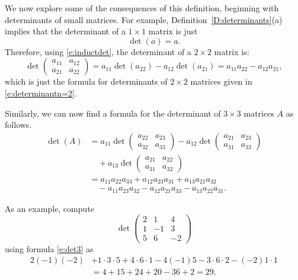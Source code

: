 \documentclass{ximera}
\begin{document}
We now explore some of the consequences of this definition, beginning 
with determinants of small matrices.  For example, 
Definition~\ref{D:determinants}(a) implies that the determinant of a 
$1\times 1$ matrix is just
\[
\det(a) = a.
\]
Therefore, using \eqref{e:inductdet}, the determinant of a $2\times
2$ matrix is:
\[
\det\left(\begin{array}{cc} a_{11} & a_{12}\\a_{21} & a_{22}
\end{array}\right) = a_{11}\det(a_{22}) - a_{12}\det(a_{21}) =
a_{11}a_{22} - a_{12}a_{21},
\]
which is just the formula for determinants of $2\times 2$
matrices given in \eqref{e:determinantn=2}. 
 
Similarly, we can now find a formula for the determinant of
$3\times 3$ matrices $A$ as follows.
\begin{align}
\det(A) & = a_{11}
\det \left(\begin{array}{cc} a_{22} & a_{23}\\a_{32} & a_{33}
\end{array}\right) 
- a_{12}
\det \left(\begin{array}{cc} a_{21} & a_{23}\\a_{31} & a_{33}
           \end{array}\right)  \nonumber\\
  &\quad + a_{13}
\det\left(\begin{array}{cc} a_{21} & a_{22}\\a_{31} & a_{32}
\end{array}\right)  \nonumber\\
        & = a_{11}a_{22}a_{33} + a_{12}a_{23}a_{31} + a_{13}a_{21}a_{32}  \nonumber\\
  &\quad - a_{11}a_{23}a_{32} - a_{12}a_{21}a_{33} - a_{13}a_{22}a_{31}. \label{e:det3}
\end{align}  

As an example, compute
\[
\det\left(\begin{array}{rrr} 2 & 1 & 4\\ 1 & -1 & 3\\ 5 & 6 & -2
\end{array}\right) 
\]
using formula \eqref{e:det3} as
\begin{align*}
2(-1)(-2) & + 1\cdot3\cdot5 + 4\cdot6\cdot1 -4(-1)5 -3\cdot6\cdot2
            - (-2)1\cdot1 \\
  &= 4+15+24+20 -36 +2 = 29. 
\end{align*}
\end{document}
